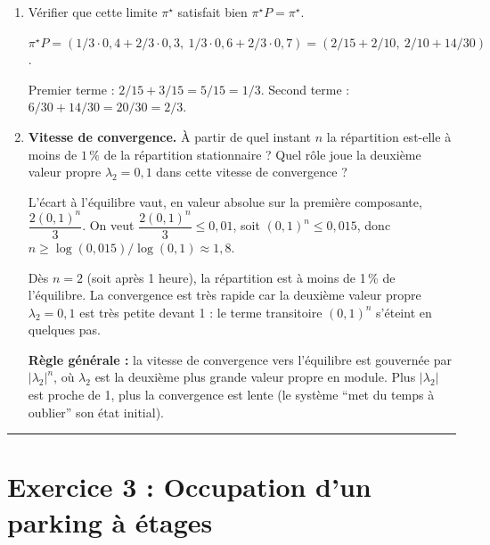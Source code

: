 \begin{enumerate}[label=\alph*), itemsep=0.6em]
  \item Vérifier que cette limite $\pi^\star$ satisfait bien $\pi^\star P = \pi^\star$.

\begin{solution}
$\pi^\star P = (1/3 \cdot 0{,}4 + 2/3 \cdot 0{,}3,\ 1/3 \cdot 0{,}6 + 2/3 \cdot 0{,}7) = (2/15 + 2/10,\ 2/10 + 14/30)$.

Premier terme : $2/15 + 3/15 = 5/15 = 1/3$. Second terme : $6/30 + 14/30 = 20/30 = 2/3$. \checkmark
\end{solution}

  \item \textbf{Vitesse de convergence.} À partir de quel instant $n$ la répartition est-elle à moins de $1\,\%$ de la répartition stationnaire ? Quel rôle joue la deuxième valeur propre $\lambda_2 = 0{,}1$ dans cette vitesse de convergence ?

\begin{solution}
L'écart à l'équilibre vaut, en valeur absolue sur la première composante, $\dfrac{2(0{,}1)^n}{3}$. On veut $\dfrac{2(0{,}1)^n}{3} \leq 0{,}01$, soit $(0{,}1)^n \leq 0{,}015$, donc $n \geq \log(0{,}015)/\log(0{,}1) \approx 1{,}8$.

Dès $n = 2$ (soit après 1 heure), la répartition est à moins de 1\,\% de l'équilibre. La convergence est très rapide car la deuxième valeur propre $\lambda_2 = 0{,}1$ est très petite devant 1 : le terme transitoire $(0{,}1)^n$ s'éteint en quelques pas.

\textbf{Règle générale :} la vitesse de convergence vers l'équilibre est gouvernée par $|\lambda_2|^n$, où $\lambda_2$ est la deuxième plus grande valeur propre en module. Plus $|\lambda_2|$ est proche de 1, plus la convergence est lente (le système ``met du temps à oublier'' son état initial).
\end{solution}
\end{enumerate}

\vspace{1.5em}
\hrule
\vspace{2em}


\section*{Exercice 3 : Occupation d'un parking à étages}

